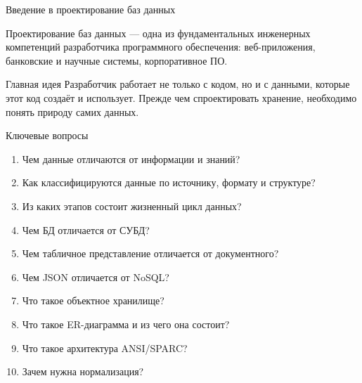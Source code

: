 \documentclass[aspectratio=169]{beamer}
\begin{document}
\begin{frame}{Введение в проектирование баз данных}

Проектирование баз данных — одна из фундаментальных
инженерных компетенций разработчика программного обеспечения:
веб-приложения, банковские и научные системы, корпоративное ПО.

\vspace{0.5cm}

\begin{alertblock}{Главная идея}
Разработчик работает не только с кодом,
но и с данными, которые этот код создаёт и использует.
Прежде чем спроектировать хранение, необходимо понять
природу самих данных.
\end{alertblock}

\end{frame}

\begin{frame}{Ключевые вопросы}

\small
\begin{enumerate}
  \item Чем данные отличаются от информации и знаний?
  \item Как классифицируются данные по источнику, формату и структуре?
  \item Из каких этапов состоит жизненный цикл данных?
  \item Чем БД отличается от СУБД?
  \item Чем табличное представление отличается от документного?
  \item Чем JSON отличается от NoSQL?
  \item Что такое объектное хранилище?
  \item Что такое ER-диаграмма и из чего она состоит?
  \item Что такое архитектура ANSI/SPARC?
  \item Зачем нужна нормализация?
\end{enumerate}

\end{frame}



\end{document}

